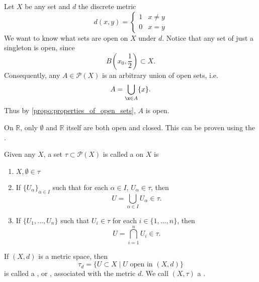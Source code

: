 \documentclass[notoc,notitlepage]{tufte-book}
\begin{document}
\begin{eg}
  Let $X$ be any set and $d$ the discrete metric
  \begin{equation*}
    d(x, y) = \begin{cases}
      1 & x \neq y \\
      0 & x = y
    \end{cases}
  \end{equation*}
  We want to know what sets are open on $X$ under $d$. Notice that any set of just a singleton is open, since
  \begin{equation*}
    B\left(x_0, \frac{1}{2}\right) \subset X.
  \end{equation*}
  Consequently, any $A \in \mathcal{P}(X)$ is an arbitrary union of open sets, i.e.
  \begin{equation*}
    A = \bigcup_{\x \in A} \{ x \}.
  \end{equation*}
  Thus by \cref{propo:properties_of_open_sets}, $A$ is open.
\end{eg}

\begin{note}
  On $\mathbb{R}$, only $\emptyset$ and $\mathbb{R}$ itself are both open and closed. This can be proven using the .
\end{note}

\begin{defn}[Topology]
\label{defn:topology}
  Given any $X$, a set $\tau \subset \mathcal{P}(X)$ is called a  on $X$ is
  \begin{enumerate}
    \item $X, \emptyset \in \tau$
    \item If $\{ U_\alpha \}_{\alpha \in I}$ such that for each $\alpha \in I$, $U_\alpha \in \tau$, then
      \begin{equation*}
        U = \bigcup_{\alpha \in I} U_\alpha \in \tau.
      \end{equation*}
    \item If $\{ U_1, ..., U_n \}$ such that $U_i \in \tau$ for each $i \in \{1, ..., n\}$, then
      \begin{equation*}
        U = \bigcap_{i = 1}^{n} U_i \in \tau.
      \end{equation*}
  \end{enumerate}
  If $(X, d)$ is a metric space, then
  \begin{equation*}
    \tau_d = \{ U \subset X \mid U \text{ open in } (X, d) \}
  \end{equation*}
  is called a , or , associated with the metric $d$. We call $(X, \tau)$ a .
\end{defn}
\end{document}
